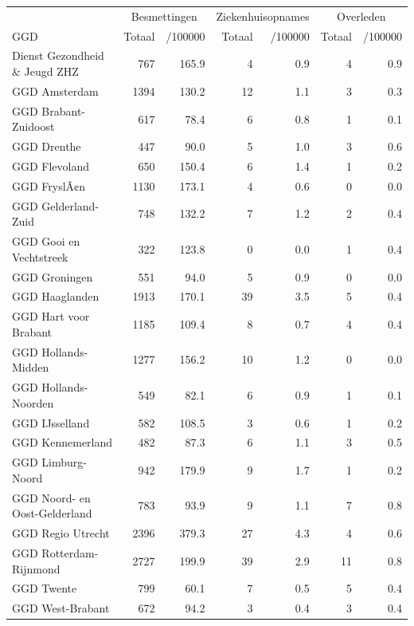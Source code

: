 \documentclass[
  english,
  man,floatsintext]{apa6}
\begin{document}
\begin{table}
\centering\begingroup\fontsize{10}{12}\selectfont

\begin{threeparttable}
\begin{tabular}{lrrrrrr}
\toprule
\multicolumn{1}{c}{ } & \multicolumn{2}{c}{Besmettingen} & \multicolumn{2}{c}{Ziekenhuisopnames} & \multicolumn{2}{c}{Overleden} \\
\cmidrule(l{3pt}r{3pt}){2-3} \cmidrule(l{3pt}r{3pt}){4-5} \cmidrule(l{3pt}r{3pt}){6-7}
GGD & Totaal & /100000 & Totaal & /100000 & Totaal & /100000\\
\midrule
Dienst Gezondheid \& Jeugd ZHZ & 767 & 165.9 & 4 & 0.9 & 4 & 0.9\\
GGD Amsterdam & 1394 & 130.2 & 12 & 1.1 & 3 & 0.3\\
GGD Brabant-Zuidoost & 617 & 78.4 & 6 & 0.8 & 1 & 0.1\\
GGD Drenthe & 447 & 90.0 & 5 & 1.0 & 3 & 0.6\\
GGD Flevoland & 650 & 150.4 & 6 & 1.4 & 1 & 0.2\\
GGD FryslÃ¢n & 1130 & 173.1 & 4 & 0.6 & 0 & 0.0\\
GGD Gelderland-Zuid & 748 & 132.2 & 7 & 1.2 & 2 & 0.4\\
GGD Gooi en Vechtstreek & 322 & 123.8 & 0 & 0.0 & 1 & 0.4\\
GGD Groningen & 551 & 94.0 & 5 & 0.9 & 0 & 0.0\\
GGD Haaglanden & 1913 & 170.1 & 39 & 3.5 & 5 & 0.4\\
GGD Hart voor Brabant & 1185 & 109.4 & 8 & 0.7 & 4 & 0.4\\
GGD Hollands-Midden & 1277 & 156.2 & 10 & 1.2 & 0 & 0.0\\
GGD Hollands-Noorden & 549 & 82.1 & 6 & 0.9 & 1 & 0.1\\
GGD IJsselland & 582 & 108.5 & 3 & 0.6 & 1 & 0.2\\
GGD Kennemerland & 482 & 87.3 & 6 & 1.1 & 3 & 0.5\\
GGD Limburg-Noord & 942 & 179.9 & 9 & 1.7 & 1 & 0.2\\
GGD Noord- en Oost-Gelderland & 783 & 93.9 & 9 & 1.1 & 7 & 0.8\\
GGD Regio Utrecht & 2396 & 379.3 & 27 & 4.3 & 4 & 0.6\\
GGD Rotterdam-Rijnmond & 2727 & 199.9 & 39 & 2.9 & 11 & 0.8\\
GGD Twente & 799 & 60.1 & 7 & 0.5 & 5 & 0.4\\
GGD West-Brabant & 672 & 94.2 & 3 & 0.4 & 3 & 0.4\\

\end{tabular}
\end{threeparttable}
\end{table}
\end{document}
